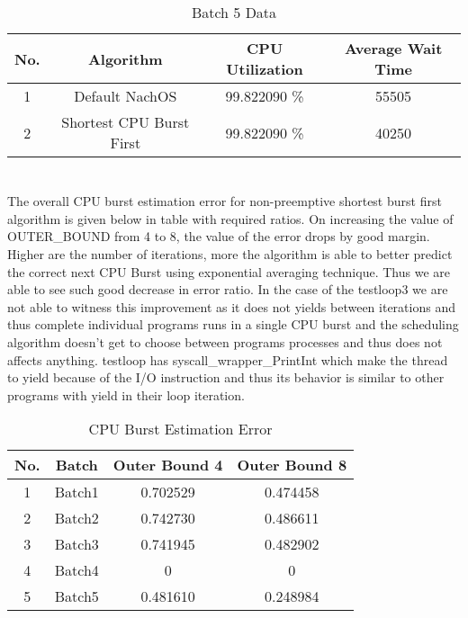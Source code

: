 \documentclass{article}
\begin{document}
\begin{table}[!htb]
	\caption{Batch 5 Data}
	\begin{tabular}{ |c|c|c|c| }
		\hline
		\textbf{No.} & \textbf{Algorithm} & \textbf{CPU Utilization} & \textbf{Average Wait Time} \\ \hline
		1	&	Default	NachOS	&			99.822090	\%	&	55505	\\	\hline
		2	&	Shortest	CPU	Burst	First	&	99.822090	\%	&	40250	\\	\hline
	\end{tabular}

	
\end{table}
		


\section*{}
	The overall CPU burst estimation error for non-preemptive shortest burst first algorithm is given below in table with required ratios.
	On increasing the value of OUTER\_BOUND from 4 to 8, the value of the error drops by good margin. Higher are the number of iterations, more the algorithm is able to better predict
	the correct next CPU Burst using exponential averaging technique. Thus we are able to see such good decrease in error ratio.
	In the case of the testloop3 we are not able to witness this improvement as it does not yields between iterations and thus complete individual programs runs in a single CPU burst and the scheduling algorithm
doesn't get to choose between programs processes and thus does not affects anything.
	testloop has syscall\_wrapper\_PrintInt which make the thread to yield because of the I/O instruction and
	thus its behavior is similar to other programs with yield in their loop iteration.

\begin{table}[!htb]
	\caption{CPU Burst Estimation Error}
	\begin{tabular}{ |c|c|c|c| }
		\hline
		\textbf{No.} & \textbf{Batch} & \textbf{Outer Bound 4 } & \textbf{Outer Bound 8} \\ \hline
		1	&	Batch1	&			0.702529		&	0.474458	\\	\hline
		2	&	Batch2	&	0.742730		&	0.486611	\\	\hline
		3	&	Batch3	&	0.741945		&	0.482902	\\	\hline
		4	&	Batch4	&	0		&		0	\\	\hline
		5	&	Batch5	&	0.481610		&	0.248984	\\	\hline
	\end{tabular}
	
	
\end{table}
\end{document}
